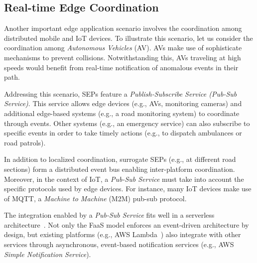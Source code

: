 \subsection{Real-time Edge Coordination}\label{sec:SEP_RTEC}



Another important edge application scenario involves the coordination among distributed mobile and IoT devices. %
To illustrate this scenario, let us consider the coordination among \textit{Autonomous Vehicles} (AV). %
AVs make use of sophisticate mechanisms to prevent collisions. Notwithstanding this, AVs traveling at high speeds would benefit from real-time notification of anomalous events in their path. 

Addressing this scenario, SEPs feature a \textit{Publish-Subscribe Service (Pub-Sub Service)}. This service allows edge devices (e.g., AVs, monitoring cameras) and additional edge-based systems (e.g., a road monitoring system) to coordinate through events.
Other systems (e.g., an emergency service) can also subscribe to specific events in order to take timely actions (e.g., to dispatch ambulances or road patrols).

In addition to localized coordination, surrogate SEPs (e.g., at different road sections) form a distributed event bus enabling inter-platform coordination. Moreover, in the context of IoT, a \textit{Pub-Sub Service} must take into account the specific protocols used by edge devices. For instance, many IoT devices make use of MQTT, a \textit{Machine to Machine} (M2M) pub-sub protocol. 

The integration enabled by a \textit{Pub-Sub Service} fits well in a serverless architecture~\cite{Lloyd18serverless}. Not only the FaaS model enforces an event-driven architecture by design, but existing platforms (e.g., AWS Lambda~\cite{AWSLambda}) also integrate with other services through asynchronous, event-based notification services (e.g., AWS \textit{Simple Notification Service}). 



